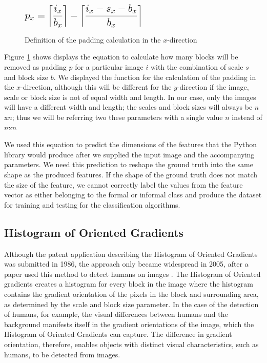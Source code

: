 \begin{figure}[h]
    \centering
    $\mathlarger{\mathlarger{\mathlarger{   p_x = \ceil*{\frac{i_x}{b_x}} - \ceil*{\frac{i_x - s_x - b_x}{b_x}} }}}$
    \caption{Definition of the padding calculation in the $x$-direction}
    \label{padding}
\end{figure}

Figure \ref{padding} shows displays the equation to calculate how many blocks will be removed as padding $p$ for a particular image $i$ with the combination of scale $s$ and block size $b$. We displayed the function for the calculation of the padding in the $x$-direction, although this will be different for the $y$-direction if the image, scale or block size is not of equal width and length. In our case, only the images will have a different width and length; the scales and block sizes will always be $n$x$n$; thus we will be referring two these parameters with a single value $n$ instead of $n$x$n$

We used this equation to predict the dimensions of the features that the Python library would produce after we supplied the input image and the accompanying parameters. We need this prediction to reshape the ground truth into the same shape as the produced features. If the shape of the ground truth does not match the size of the feature, we cannot correctly label the values from the feature vector as either belonging to the formal or informal class and produce the dataset for training and testing for the classification algorithms.

\subsection{Histogram of Oriented Gradients}

Although the patent application describing the Histogram of Oriented Gradients was submitted in 1986, the approach only became widespread in 2005, after a paper used this method to detect humans on images \cite{dalal2005histograms}. The Histogram of Oriented gradients creates a histogram for every block in the image where the histogram contains the gradient orientation of the pixels in the block and surrounding area, as determined by the scale and block size parameter. In the case of the detection of humans, for example, the visual differences between humans and the background manifests itself in the gradient orientations of the image, which the Histogram of Oriented Gradients can capture. The difference in gradient orientation, therefore, enables objects with distinct visual characteristics, such as humans, to be detected from images.

